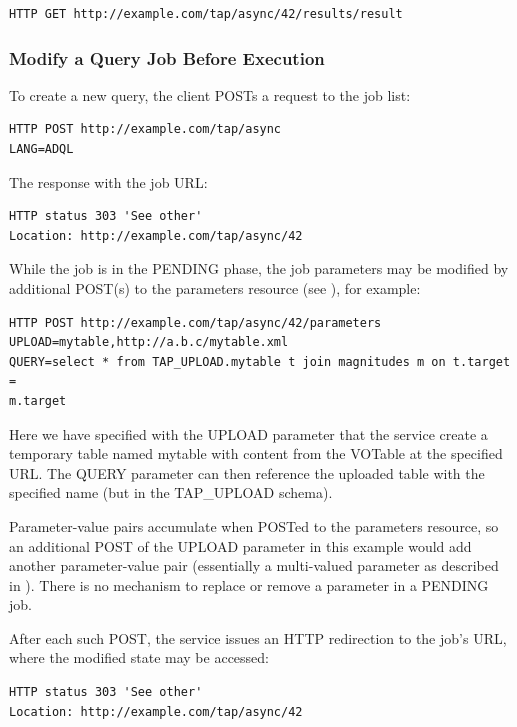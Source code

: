 \documentclass[11pt,letter]{ivoa}
\begin{document}
\begin{verbatim}
HTTP GET http://example.com/tap/async/42/results/result
\end{verbatim}

\subsubsection{Modify a Query Job Before Execution}
To create a new query, the client POSTs a request to the job list:

\begin{verbatim}
HTTP POST http://example.com/tap/async
LANG=ADQL
\end{verbatim}

The response with the job URL:

\begin{verbatim}
HTTP status 303 'See other'
Location: http://example.com/tap/async/42
\end{verbatim}

While the job is in the PENDING phase, the job parameters may be modified 
by additional POST(s) to the parameters resource (see 
\citep{std:DALI}), for example:

\begin{verbatim}
HTTP POST http://example.com/tap/async/42/parameters
UPLOAD=mytable,http://a.b.c/mytable.xml
QUERY=select * from TAP_UPLOAD.mytable t join magnitudes m on t.target = 
m.target
\end{verbatim}

Here we have specified with the UPLOAD parameter that the service create a 
temporary table named mytable with content from the VOTable at the specified 
URL. The QUERY parameter can then reference the uploaded table with the 
specified name (but in the TAP\_UPLOAD schema).

Parameter-value pairs accumulate when POSTed to the parameters resource, so an 
additional POST of the UPLOAD parameter in this example would add another 
parameter-value pair (essentially a multi-valued parameter as described in 
\citep{std:DALI}). There is no mechanism to replace or remove a parameter in a 
PENDING job.

After each such POST, the service issues an HTTP redirection to the job's URL, 
where the modified state may be accessed:

\begin{verbatim}
HTTP status 303 'See other'
Location: http://example.com/tap/async/42
\end{verbatim}
\end{document}
